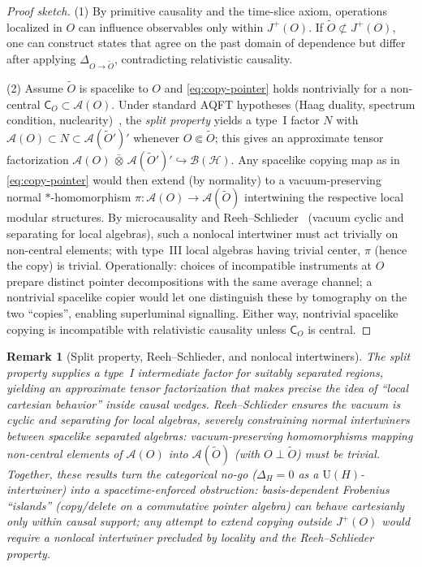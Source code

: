 \documentclass[11pt]{article}
\theoremstyle{upright}
\newtheorem{remark}{Remark}
\begin{document}
\begin{proof}[Proof sketch]
(1) By primitive causality and the time-slice axiom, operations localized in $O$ can influence observables only within $J^+(O)$. If $\tilde O\not\subset J^+(O)$, one can construct states that agree on the past domain of dependence but differ after applying $\Delta_{O\to\tilde O}$, contradicting relativistic causality.

(2) Assume $\tilde O$ is spacelike to $O$ and \eqref{eq:copy-pointer} holds nontrivially for a non-central $\mathsf{C}_O\subset\mathcal{A}(O)$. Under standard AQFT hypotheses (Haag duality, spectrum condition, nuclearity)~\cite{BuchholzWichmann1986,DoplicherLongo1984}, the \emph{split property} yields a type~I factor $N$ with $\mathcal{A}(O)\subset N \subset \mathcal{A}(\tilde O')'$ whenever $O\Subset\tilde O$; this gives an approximate tensor factorization $\mathcal{A}(O)\,\bar\otimes\,\mathcal{A}(\tilde O')'\hookrightarrow\mathcal{B}(\mathcal{H})$. Any spacelike copying map as in \eqref{eq:copy-pointer} would then extend (by normality) to a vacuum-preserving normal $*$-homomorphism $\pi:\mathcal{A}(O)\to\mathcal{A}(\tilde O)$ intertwining the respective local modular structures. By microcausality and Reeh--Schlieder~\cite{ReehSchlieder1961} (vacuum cyclic and separating for local algebras), such a nonlocal intertwiner must act trivially on non-central elements; with type~III local algebras having trivial center, $\pi$ (hence the copy) is trivial. Operationally: choices of incompatible instruments at $O$ prepare distinct pointer decompositions with the same average channel; a nontrivial spacelike copier would let one distinguish these by tomography on the two ``copies'', enabling superluminal signalling. Either way, nontrivial spacelike copying is incompatible with relativistic causality unless $\mathsf{C}_O$ is central.
\end{proof}

\begin{remark}[Split property, Reeh--Schlieder, and nonlocal intertwiners]
\label{rem:split-reeh}
The split property \cite{BuchholzWichmann1986,DoplicherLongo1984} supplies a type~I intermediate factor for suitably separated regions, yielding an approximate tensor factorization that makes precise the idea of ``local cartesian behavior'' inside causal wedges. Reeh--Schlieder \cite{ReehSchlieder1961,Haag1992} ensures the vacuum is cyclic and separating for local algebras, severely constraining normal intertwiners between spacelike separated algebras: vacuum-preserving homomorphisms mapping non-central elements of $\mathcal{A}(O)$ into $\mathcal{A}(\tilde O)$ (with $O\perp \tilde O$) must be trivial. Together, these results turn the categorical no-go ($\Delta_H=0$ as a $\mathrm{U}(H)$-intertwiner) into a spacetime-enforced obstruction: basis-dependent Frobenius ``islands'' (copy/delete on a commutative pointer algebra) can behave cartesianly only \emph{within} causal support; any attempt to extend copying outside $J^+(O)$ would require a nonlocal intertwiner precluded by locality and the Reeh--Schlieder property.
\end{remark}
\end{document}
